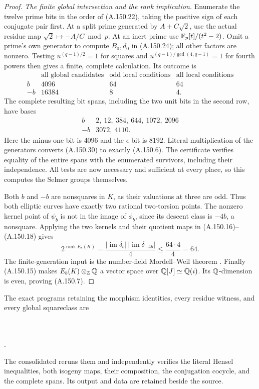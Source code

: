 \begin{proof}
\emph{The finite global intersection and the rank implication.}
Enumerate the twelve prime bits in the order of
(A.150.22), taking the positive sign of each
conjugate pair first.
At a split prime generated by \(A+C\sqrt2\),
use the actual residue map
\(\sqrt2\mapsto-A/C\bmod p\).
At an inert prime use
\(\mathbb F_p[t]/(t^2-2)\).
Omit a prime's own generator to compute \(B_0,d_0\)
in (A.150.24); all other factors are nonzero.
Testing \(u^{(q-1)/2}=1\) for squares and
\(u^{(q-1)/\gcd(4,q-1)}=1\) for fourth powers
then gives a finite, complete calculation.
Its outcome is
\[
 \begin{array}{c|r|r|r}
 &\text{all global candidates}&\text{odd local conditions}
                                      &\text{all local conditions}\\ \hline
 b&4096&64&64\\
 -b&16384&8&4 .
 \end{array}
\tag{A.150.29}
\]
The complete resulting bit spans, including the two
unit bits in the second row, have bases
\[
 \begin{array}{c|l}
 b&2,\ 12,\ 384,\ 644,\ 1072,\ 2096\\
 -b&3072,\ 4110 .
 \end{array}
\tag{A.150.30}
\]
Here the minus-one bit is \(4096\) and the
\(\epsilon\) bit is \(8192\).
Literal multiplication of the generators converts
(A.150.30) to exactly (A.150.6).
The certificate verifies equality of the entire
spans with the enumerated survivors, including
their independence.  All tests are now necessary
and sufficient at every place, so this computes
the Selmer groups themselves.

Both \(b\) and \(-b\) are nonsquares in \(K\),
as their valuations at three are odd.
Thus both elliptic curves have exactly two
rational two-torsion points.
The nonzero kernel point of \(\psi_b\) is not in
the image of \(\phi_b\), since its descent class
is \(-4b\), a nonsquare.
Applying the two kernels and their quotient maps
in (A.150.16)--(A.150.18) gives
\[
 2^{\operatorname{rank}E_b(K)}
       =\frac{|\operatorname{im}\delta_b|\,
                   |\operatorname{im}\delta_{-4b}|}{4}
       \le\frac{64\cdot4}{4}=64 .
\tag{A.150.31}
\]
The finite-generation input is the number-field
Mordell--Weil theorem
\cite[Chapter IV, unnumbered finite basis theorem,
printed p.~105, and \S4]{AgentMilneEC2021}.
Finally (A.150.15) makes
\(E_b(K)\otimes_\mathbb Z\mathbb Q\) a vector space over
\(\mathbb Q[J]\simeq\mathbb Q(i)\).  Its \(\mathbb Q\)-dimension is even,
proving (A.150.7).
\end{proof}

The exact programs retaining the morphism identities,
every residue witness, and every global squareclass are
\begin{flushleft}
\\
\\
.
\end{flushleft}
The consolidated
reruns them and independently verifies the literal
Hensel inequalities, both isogeny maps, their composition,
the conjugation cocycle, and the complete spans.
Its output and data are retained beside the source.
